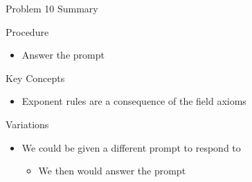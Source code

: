 \begin{summary}{Problem 10 Summary}
    \begin{statement}{Procedure}
        \begin{itemize}
            \item Answer the prompt
        \end{itemize}
    \end{statement}
    \begin{statement}{Key Concepts}
        \begin{itemize}
            \item Exponent rules are a consequence of the field axioms
        \end{itemize}
    \end{statement}
    \begin{statement}{Variations}
        \begin{itemize}
            \item We could be given a different prompt to respond to
            \begin{itemize}
                \item We then would answer the prompt
            \end{itemize}
        \end{itemize}
    \end{statement}
\end{summary}